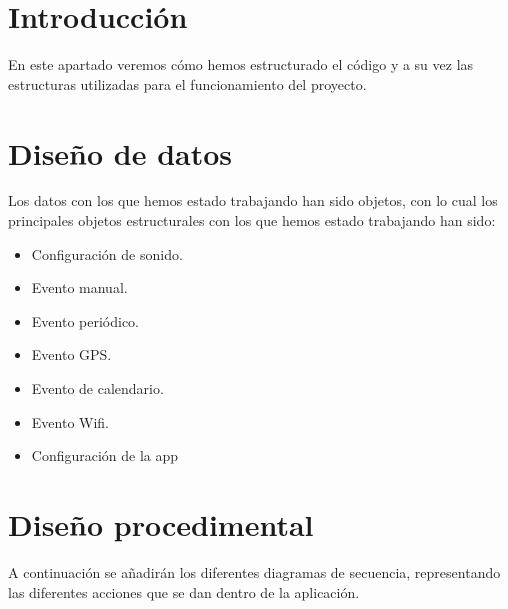 
\section{Introducción}
En este apartado veremos cómo hemos estructurado el código y a su vez las estructuras utilizadas para el funcionamiento del proyecto.
\section{Diseño de datos}
Los datos con los que hemos estado trabajando han sido objetos, con lo cual los principales objetos estructurales con los que hemos estado trabajando han sido:
\begin{itemize}
	\item Configuración de sonido.
	\item Evento manual.
	\item Evento periódico.
	\item Evento GPS.
	\item Evento de calendario.
	\item Evento Wifi.
	\item Configuración de la app
\end{itemize}



\section{Diseño procedimental}
A continuación se añadirán los diferentes diagramas de secuencia, representando las diferentes acciones que se dan dentro de la aplicación.






